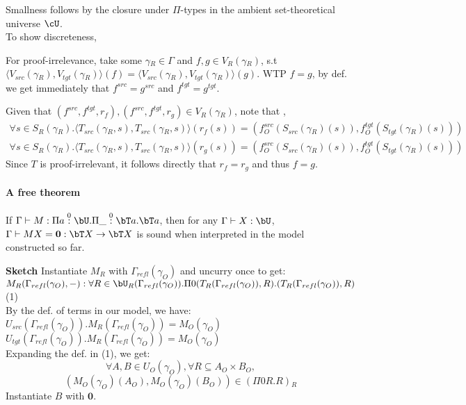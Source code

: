 \documentclass[12pt,a4paper]{article}
\def\src{_{src}}\alwaysmath{src}
\def\rfl{_{refl}}\alwaysmath{rfl}
\def\tgt{_{tgt}}\alwaysmath{tgt}
\renewcommand{\O}{_{O}}
\newcommand{\R}{\ensuremath{_{R}}}
\begin{document}
Smallness follows by the closure under $\Pi$-types in the ambient set-theoretical universe $\cU$.\\

To show discreteness, 

For proof-irrelevance, take some $\gamma\R \in \Gamma$ and $f , g \in V\R(\gamma\R)$, s.t $\langle V\src(\gamma\R), V\tgt(\gamma\R) \rangle (f) = \langle V\src(\gamma\R), V\tgt(\gamma\R) \rangle (g)$. WTP $f = g$, by def. we get immediately that $f^{src} = g^{src}$ and $f^{tgt} = g^{tgt}$. 

Given that $(f^{src}, f^{tgt}, r_f), (f^{src}, f^{tgt}, r_g) \in V\R(\gamma\R)$, note that , 
\begin{align*}
  \forall s \in S\R(\gamma\R). \langle T\src(\gamma\R, s), T\src(\gamma\R, s) \rangle  ( r_f(s)) = (f\O^{src}(S\src(\gamma\R)(s)), f\O^{tgt}(S\tgt(\gamma\R)(s)))\\
  \forall s \in S\R(\gamma\R). \langle T\src(\gamma\R, s), T\src(\gamma\R, s) \rangle  ( r_g(s)) = (f\O^{src}(S\src(\gamma\R)(s)), f\O^{tgt}(S\tgt(\gamma\R)(s)))
\end{align*}
Since $T$ is proof-irrelevant, it follows directly that $r_f = r_g$ and thus $f = g$. 

\paragraph{A free theorem}
\begin{thm}
  If $\Gamma \vdash M : \Pi a \overset{0}{:} \bU . \Pi \_ \overset{0}{:} \bT a . \bT a$, 
  then for any $\Gamma \vdash X : \bU$, $\Gamma \vdash M X  = \mathbf{0} : \bT X \to \bT X$ is sound when interpreted in the model constructed so far.
\end{thm}
\textbf{Sketch } Instantiate $M\R$ with $\Gamma\rfl(\gamma\O)$ and uncurry once to get:\\
$M\R(\Gamma\rfl(\gamma\O), -): \forall R \in \bU\R(\Gamma\rfl(\gamma\O)). \Pi 0 (T\R(\Gamma\rfl(\gamma\O)), R) . (T\R(\Gamma\rfl(\gamma\O)), R)$ (1)\\
By the def. of terms in our model, we have:\\
$U\src(\Gamma\rfl(\gamma\O)). M\R(\Gamma\rfl(\gamma\O)) = M\O(\gamma\O)$\\
$U\tgt(\Gamma\rfl(\gamma\O)). M\R(\Gamma\rfl(\gamma\O)) = M\O(\gamma\O)$\\
Expanding the def. in (1), we get:\\
$$\forall A, B \in U\O(\gamma\O), \forall R \subseteq A\O \times B\O,$$
$$(M\O(\gamma\O)(A\O),  M\O(\gamma\O)(B\O) ) \in (\Pi 0 R . R)\R$$
Instantiate $B$ with $\mathbf{0}$.\\
\end{document}
